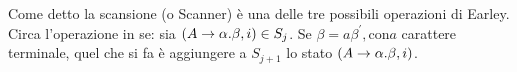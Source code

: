 \documentclass{subfiles}
\begin{document}
Come detto la scansione (o Scanner) è una delle tre possibili operazioni di Earley.
Circa l'operazione in se: sia $(\Grammar{A}{\alpha . \beta} , i) \in S_{j}$. Se $\beta = a\beta^{'}, \text{con} a$ carattere terminale,
quel che si fa è aggiungere a $S_{j + 1}$ lo stato $(\Grammar{A}{\alpha . \beta} , i)$.
\end{document}
